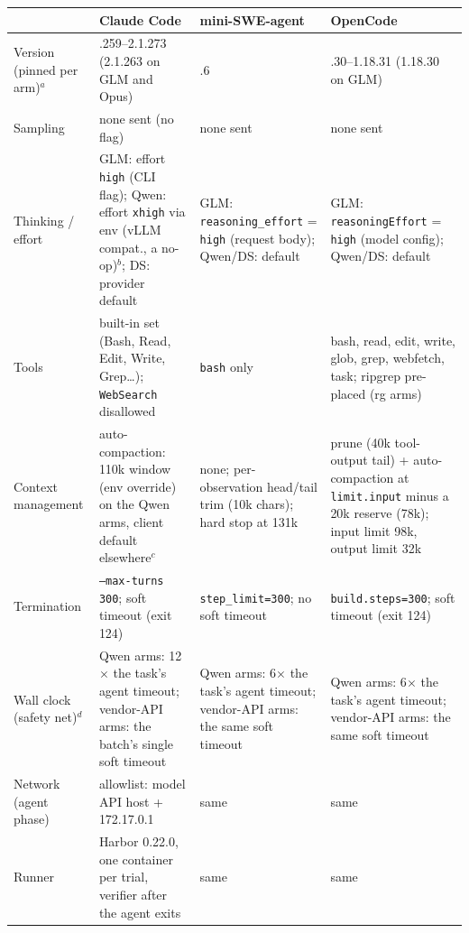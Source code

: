 \footnotesize\setlength{\tabcolsep}{4pt}
\begin{tabular}{@{}>{\raggedright\arraybackslash}p{2.2cm}>{\raggedright\arraybackslash}p{3.9cm}>{\raggedright\arraybackslash}p{3.3cm}>{\raggedright\arraybackslash}p{3.7cm}@{}}
\toprule
 & Claude Code & mini-SWE-agent & OpenCode \\
\midrule
Version (pinned per arm)$^{a}$ & 2.1.259--2.1.273 (2.1.263 on GLM and Opus) & 2.4.6 & 1.18.30--1.18.31 (1.18.30 on GLM) \\
Sampling & none sent (no flag) & none sent & none sent \\
Thinking / effort & GLM: effort \texttt{high} (CLI flag); Qwen: effort \texttt{xhigh} via env (vLLM compat., a no-op)$^{b}$; DS: provider default & GLM: \texttt{reasoning\_effort} = \texttt{high} (request body); Qwen/DS: default & GLM: \texttt{reasoningEffort} = \texttt{high} (model config); Qwen/DS: default \\
Tools & built-in set (Bash, Read, Edit, Write, Grep\ldots); \texttt{WebSearch} disallowed & \texttt{bash} only & bash, read, edit, write, glob, grep, webfetch, task; ripgrep pre-placed (rg arms) \\
Context management & auto-compaction: 110k window (env override) on the Qwen arms, client default elsewhere$^{c}$ & none; per-observation head/tail trim (10k chars); hard stop at 131k & prune (40k tool-output tail) + auto-compaction at \texttt{limit.input} minus a 20k reserve (78k); input limit 98k, output limit 32k \\
Termination & \texttt{--max-turns 300}; soft timeout (exit 124) & \texttt{step\_limit=300}; no soft timeout & \texttt{build.steps=300}; soft timeout (exit 124) \\
Wall clock (safety net)$^{d}$ & Qwen arms: 12$\times$ the task's agent timeout; vendor-API arms: the batch's single soft timeout & Qwen arms: 6$\times$ the task's agent timeout; vendor-API arms: the same soft timeout & Qwen arms: 6$\times$ the task's agent timeout; vendor-API arms: the same soft timeout \\
Network (agent phase) & allowlist: model API host + 172.17.0.1 & same & same \\
Runner & Harbor 0.22.0, one container per trial, verifier after the agent exits & same & same \\
\bottomrule

\end{tabular}
